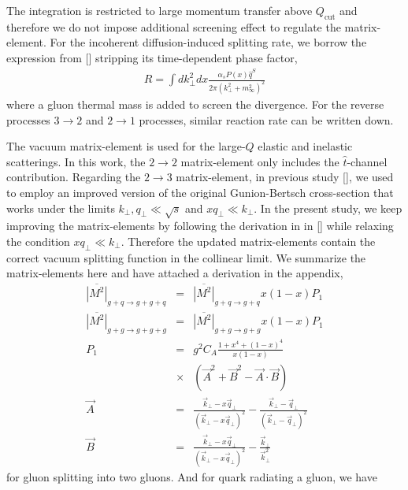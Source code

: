 \documentclass[aps, prc, reprint, amsmath, groupedaddress, nofootinbib]{revtex4-1}
\begin{document}
The integration is restricted to large momentum transfer above $Q_{\textrm{cut}}$ and therefore we do not impose additional screening effect to regulate the matrix-element.
For the incoherent diffusion-induced splitting rate, we borrow the expression from [] stripping its time-dependent phase factor,
\begin{eqnarray}
R = \int d k_\perp^2 dx \frac{\alpha_s P(x) \hat{q}^S}{2\pi (k_\perp^2 + m_\infty^2)^2}
\end{eqnarray}
where a gluon thermal mass is added to screen the divergence.
For the reverse processes $3\rightarrow 2$  and $2\rightarrow 1$ processes, similar reaction rate can be written down.

The vacuum matrix-element is used for the large-$Q$ elastic and inelastic scatterings.
In this work, the $2\rightarrow 2$ matrix-element only includes the $\hat{t}$-channel contribution.
Regarding the $2\rightarrow 3$ matrix-element, in previous study [], we used to employ an improved version of the original Gunion-Bertsch cross-section that works under the limits $k_\perp, q_\perp \ll \sqrt{s}$ and $x q_\perp \ll k_\perp$.
In the present study, we keep improving the matrix-elements by following the derivation in in [] while relaxing the condition $x q_\perp \ll k_\perp$.
Therefore the updated matrix-elements contain the correct vacuum splitting function in the collinear limit.
We summarize the matrix-elements here and have attached a derivation in the appendix,
\begin{eqnarray}
\overline{|M^2|}_{g+q\rightarrow g+g+q} &=& \overline{|M^2|}_{g+q\rightarrow g+q} x(1-x) P_1\\
\overline{|M^2|}_{g+g\rightarrow g+g+g} &=& \overline{|M^2|}_{g+g\rightarrow g+g} x(1-x) P_1\\
P_1 &=& g^2  C_A\frac{1+x^4+(1-x)^4}{x(1-x)}   \\\nonumber
&\times&\left(\vec{A}^2 + \vec{B}^2 - \vec{A}\cdot\vec{B}\right)\\
\vec{A} &=& \frac{\vec{k}_\perp - x\vec{q}_\perp}{(\vec{k}_\perp - x\vec{q}_\perp)^2} -  \frac{\vec{k}_\perp - \vec{q}_\perp}{(\vec{k}_\perp - \vec{q}_\perp)^2} \\
\vec{B} &=& \frac{\vec{k}_\perp - x\vec{q}_\perp}{(\vec{k}_\perp - x\vec{q}_\perp)^2} -  \frac{\vec{k}_\perp}{\vec{k}_\perp^2}
\end{eqnarray}
for gluon splitting into two gluons. And for quark radiating a gluon, we have
\end{document}
